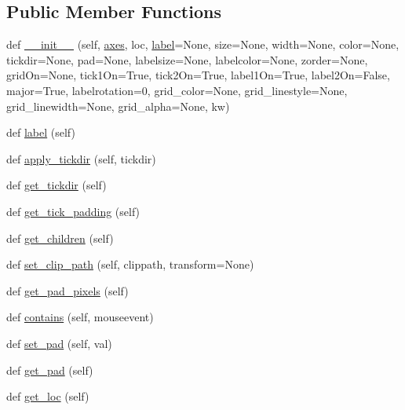 \subsection*{Public Member Functions}
\begin{DoxyCompactItemize}
\item 
def \hyperlink{classmatplotlib_1_1axis_1_1Tick_a4d2b721fdb23ad919439c4dd1bfb22f9}{\+\_\+\+\_\+init\+\_\+\+\_\+} (self, \hyperlink{classmatplotlib_1_1axis_1_1Tick_a8fc7266d394e93167cfad31c86a55394}{axes}, loc, \hyperlink{classmatplotlib_1_1axis_1_1Tick_a96de10712e4ca5bbdb71d25de4733e30}{label}=None, size=None, width=None, color=None, tickdir=None, pad=None, labelsize=None, labelcolor=None, zorder=None, grid\+On=None, tick1\+On=True, tick2\+On=True, label1\+On=True, label2\+On=False, major=True, labelrotation=0, grid\+\_\+color=None, grid\+\_\+linestyle=None, grid\+\_\+linewidth=None, grid\+\_\+alpha=None, kw)
\item 
def \hyperlink{classmatplotlib_1_1axis_1_1Tick_a96de10712e4ca5bbdb71d25de4733e30}{label} (self)
\item 
def \hyperlink{classmatplotlib_1_1axis_1_1Tick_aafa4b88843ee225f3cc35373985ee4de}{apply\+\_\+tickdir} (self, tickdir)
\item 
def \hyperlink{classmatplotlib_1_1axis_1_1Tick_a3759855ec52896f97f792cd1a38889e8}{get\+\_\+tickdir} (self)
\item 
def \hyperlink{classmatplotlib_1_1axis_1_1Tick_a079b5552b2fdd4bf1fedf539d5150070}{get\+\_\+tick\+\_\+padding} (self)
\item 
def \hyperlink{classmatplotlib_1_1axis_1_1Tick_a651b588e4f4f69b23b7edad81d0a19e5}{get\+\_\+children} (self)
\item 
def \hyperlink{classmatplotlib_1_1axis_1_1Tick_afbaf17f01f4d792788b8823d67e495fb}{set\+\_\+clip\+\_\+path} (self, clippath, transform=None)
\item 
def \hyperlink{classmatplotlib_1_1axis_1_1Tick_a05a8328408aa813fd924d7581e748d1d}{get\+\_\+pad\+\_\+pixels} (self)
\item 
def \hyperlink{classmatplotlib_1_1axis_1_1Tick_a978fb698633ac0dba6f47ed88470adfb}{contains} (self, mouseevent)
\item 
def \hyperlink{classmatplotlib_1_1axis_1_1Tick_ab547b6b2250efa529ed397d1da24b851}{set\+\_\+pad} (self, val)
\item 
def \hyperlink{classmatplotlib_1_1axis_1_1Tick_a20d29d706c84708a1bb43c71fab6973c}{get\+\_\+pad} (self)
\item 
def \hyperlink{classmatplotlib_1_1axis_1_1Tick_a0a55e1b2683a21f54ef386dc6624a2e8}{get\+\_\+loc} (self)

\end{DoxyCompactItemize}
